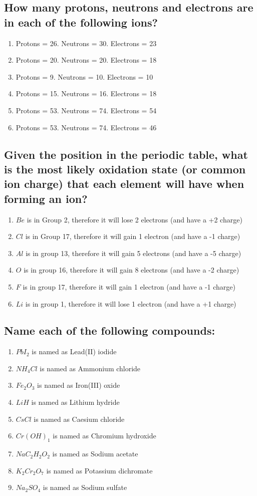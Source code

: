 \documentclass[11pt]{article}
\begin{document}
\subsection{How many protons, neutrons and electrons are in each of the following ions?}
\label{sec:org89c8e73}
\begin{enumerate}
\item Protons = 26. Neutrons = 30. Electrons = 23
\item Protons = 20. Neutrons = 20. Electrons = 18
\item Protons = 9. Neutrons = 10. Electrons = 10
\item Protons = 15. Neutrons = 16. Electrons = 18
\item Protons = 53. Neutrons = 74. Electrons = 54
\item Protons = 53. Neutrons = 74. Electrons = 46
\end{enumerate}

\subsection{Given the position in the periodic table, what is the most likely oxidation state (or common ion charge) that each element will have when forming an ion?}
\label{sec:org2a366a8}
\begin{enumerate}
\item \(Be\) is in Group 2, therefore it will lose 2 electrons (and have a +2 charge)
\item \(Cl\) is in Group 17, therefore it will gain 1 electron (and have a -1 charge)
\item \(Al\) is in group 13, therefore it will gain 5 electrons (and have a -5 charge)
\item \(O\) is in group 16, therefore it will gain 8 electrons (and have a -2 charge)
\item \(F\) is in group 17, therefore it will gain 1 electron (and have a -1 charge)
\item \(Li\) is in group 1, therefore it will lose 1 electron (and have a +1 charge)
\end{enumerate}

\subsection{Name each of the following compounds:}
\label{sec:orgb941bd3}
\begin{enumerate}
\item \(PbI_2\) is named as Lead(II) iodide
\item \(NH_4Cl\) is named as Ammonium chloride
\item \(Fe_2O_3\) is named as Iron(III) oxide
\item \(LiH\) is named as Lithium hydride
\item \(CsCl\) is named as Caesium chloride
\item \(Cr(OH)_1\) is named as Chromium hydroxide
\item \(NaC_2H_2O_2\) is named as Sodium acetate
\item \(K_2Cr_2O_7\) is named as Potassium dichromate
\item \(Na_2SO_4\) is named as Sodium sulfate
\end{enumerate}
\end{document}
